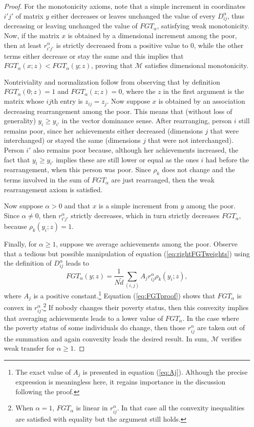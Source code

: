 \documentclass[english, a4paper,12pt]{article}
\begin{document}
\begin{proof}
For the monotonicity axioms, note that a simple increment in coordinates $i'j'$ of matrix $y$ either decreases or leaves unchanged the value of every $D_{ij}^{\alpha}$, thus decreasing or leaving unchanged the value of $FGT_{\alpha}$, satisfying weak monotonicity. Now, if the matrix $x$ is obtained by a dimensional increment among the poor, then at least $r_{i'j'}^{\alpha}$ is strictly decreased from a positive value to 0, while the other terms either decrease or stay the same and this implies that $FGT_{\alpha}(x ; z) < FGT_{\alpha}(y ; z)$, proving that $\mathcal{M}$ satisfies dimensional monotonicity.

Nontriviality and normalization follow from observing that by definition $FGT_{\alpha}(0; z) = 1$ and $FGT_{\alpha}(z; z) = 0$, where the $z$ in the first argument is the matrix whose $ij$th entry is $z_{ij} = z_{j}$. Now suppose $x$ is obtained by an association decreasing rearrangement among the poor. This means that (without loss of generality) $y_{i} \geq y_{i'}$ in the vector dominance sense. After rearranging, person $i$ still remains poor, since her achievements either decreased (dimensions $j$ that were interchanged) or stayed the same (dimensions $j$ that were not interchanged). Person $i'$ also remains poor because, although her achievements increased, the fact that $y_{i} \geq y_{i'}$ implies these are still lower or equal as the ones $i$ had before the rearrangement, when this person was poor. Since $\rho_{k}$ does not change and the terms involved in the sum of $FGT_{\alpha}$ are just rearranged, then the weak rearrangement axiom is satisfied.  

Now suppose $\alpha > 0$ and that $x$ is a simple increment from $y$ among the poor. Since $\alpha \neq 0$, then $r_{i'j'}^{\alpha}$ strictly decreases, which in turn strictly decreases $FGT_{\alpha}$, because $\rho_{k}(y_{i}; z) = 1$.

Finally, for $\alpha \geq 1$, suppose we average achievements among the poor. Observe that a tedious but possible manipulation of equation (\ref{eq:rightFGTweights}) using the definition of $D_{ij}^{\alpha}$ leads to
	\begin{equation} \label{eq:FGTproof}
		FGT_{\alpha}(y; z) = \frac{1}{N\tilde{d}} \sum_{(i,j)} A_{j}r_{ij}^{\alpha}\rho_{k}(y_{i}; z),
	\end{equation}
where $A_{j}$ is a positive constant.\footnote{The exact value of $A_{j}$ is presented in equation (\ref{eq:Aj}). Although the precise expression is meaningless here, it regains importance in the discussion following the proof.} Equation (\ref{eq:FGTproof}) shows that $FGT_{\alpha}$ is convex in $r_{ij}^{\alpha}$.\footnote{When $\alpha = 1$, $FGT_{\alpha}$ is linear in $r_{ij}^{\alpha}$. In that case all the convexity inequalities are satisfied with equality but the argument still holds.} If nobody changes their poverty status, then this convexity implies that averaging achievements leads to a lower value of $FGT_{\alpha}$. In the case where the poverty status of some individuals do change, then those $r_{ij}^{\alpha}$ are taken out of the summation and again convexity leads the desired result. In sum, $\mathcal{M}$ verifies weak transfer for $\alpha \geq 1$.
\end{proof}
\end{document}
